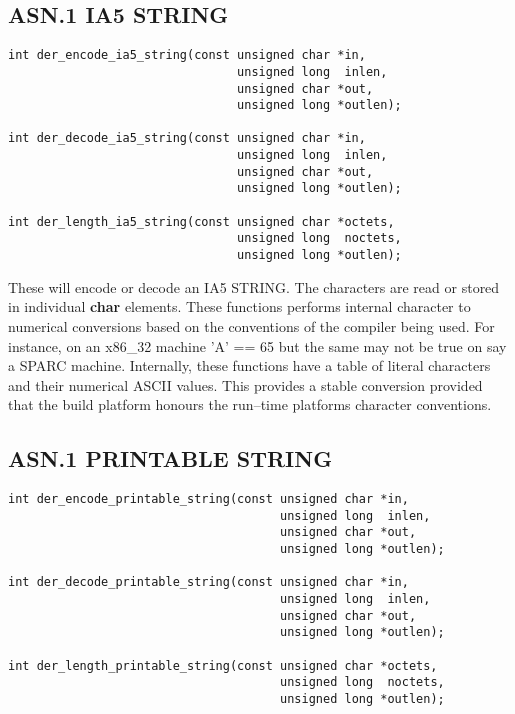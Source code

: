 \documentclass[synpaper]{book}
\begin{document}
\subsection{ASN.1 IA5 STRING}

\begin{verbatim}
int der_encode_ia5_string(const unsigned char *in, 
                                unsigned long  inlen,
                                unsigned char *out, 
                                unsigned long *outlen);

int der_decode_ia5_string(const unsigned char *in, 
                                unsigned long  inlen,
                                unsigned char *out, 
                                unsigned long *outlen);

int der_length_ia5_string(const unsigned char *octets, 
                                unsigned long  noctets, 
                                unsigned long *outlen);
\end{verbatim}

These will encode or decode an IA5 STRING.  The characters are read or stored in individual \textbf{char} elements.  These functions performs internal character
to numerical conversions based on the conventions of the compiler being used.  For instance, on an x86\_32 machine 'A' == 65 but the same may not be true on 
say a SPARC machine.  Internally, these functions have a table of literal characters and their numerical ASCII values.  This provides a stable conversion provided
that the build platform honours the run--time platforms character conventions.

\subsection{ASN.1 PRINTABLE STRING}

\begin{verbatim}
int der_encode_printable_string(const unsigned char *in, 
                                      unsigned long  inlen,
                                      unsigned char *out, 
                                      unsigned long *outlen);

int der_decode_printable_string(const unsigned char *in, 
                                      unsigned long  inlen,
                                      unsigned char *out, 
                                      unsigned long *outlen);

int der_length_printable_string(const unsigned char *octets, 
                                      unsigned long  noctets, 
                                      unsigned long *outlen);
\end{verbatim}
\end{document}
